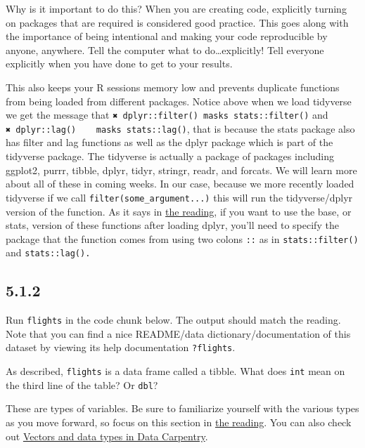 \documentclass[
]{article}
\begin{document}
Why is it important to do this? When you are creating code, explicitly
turning on packages that are required is considered good practice. This
goes along with the importance of being intentional and making your code
reproducible by anyone, anywhere. Tell the computer what to
do\ldots explicitly! Tell everyone explicitly when you have done to get
to your results.

This also keeps your R sessions memory low and prevents duplicate
functions from being loaded from different packages. Notice above when
we load tidyverse we get the message that
\texttt{✖\ dplyr::filter()\ masks\ stats::filter()} and
\texttt{✖\ dplyr::lag()\ \ \ \ masks\ stats::lag()}, that is because the
stats package also has filter and lag functions as well as the dplyr
package which is part of the tidyverse package. The tidyverse is
actually a package of packages including ggplot2, purrr, tibble, dplyr,
tidyr, stringr, readr, and forcats. We will learn more about all of
these in coming weeks. In our case, because we more recently loaded
tidyverse if we call \texttt{filter(some\_argument...)} this will run
the tidyverse/dplyr version of the function. As it says in
\href{https://r4ds.had.co.nz/transform.html\#prerequisites-2}{the
reading}, if you want to use the base, or stats, version of these
functions after loading dplyr, you'll need to specify the package that
the function comes from using two colons \texttt{::} as in
\texttt{stats::filter()} and \texttt{stats::lag().}

\hypertarget{section-1}{%
\subsection{5.1.2}\label{section-1}}

Run \texttt{flights} in the code chunk below. The output should match
the reading. Note that you can find a nice README/data
dictionary/documentation of this dataset by viewing its help
documentation \texttt{?flights}.

As described, \texttt{flights} is a data frame called a tibble. What
does \texttt{int} mean on the third line of the table? Or \texttt{dbl}?

These are types of variables. Be sure to familiarize yourself with the
various types as you move forward, so focus on this section in
\href{https://r4ds.had.co.nz/transform.html\#prerequisites-2}{the
reading}. You can also check out
\href{https://datacarpentry.org/R-ecology-lesson/01-intro-to-r.html\#Vectors_and_data_types}{Vectors
and data types in Data Carpentry}.
\end{document}
